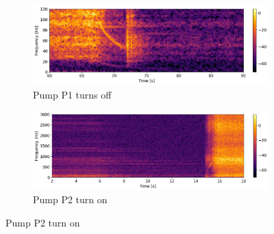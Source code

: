 \begin{figure}[h]
    \centering
    \begin{subfigure}[b]{0.48\textwidth}
        \includegraphics[width=\textwidth]{assets/results/time-frequency-spectrum/P1-slow-down.png}
        \caption{Pump P1 turns off}
    \end{subfigure}
    \hfill
    \begin{subfigure}[b]{0.48\textwidth}
        \includegraphics[width=\textwidth]{assets/results/time-frequency-spectrum/P2-speed-up.png}
        \caption{Pump P2 turn on}
    \end{subfigure}
\end{figure}

